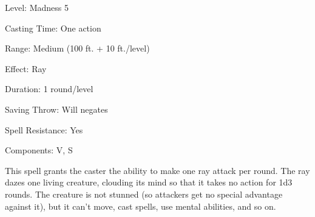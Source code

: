 
\begin{description*}
\item[Level:] Madness 5
\item[Casting Time:] One action
\item[Range:] Medium (100 ft. + 10 ft./level)
\item[Effect:] Ray
\item[Duration:] 1 round/level
\item[Saving Throw:] Will negates
\item[Spell Resistance:] Yes
\item[Components:] V, S
\end{description*}

This spell grants the caster the ability to make one ray attack per round. The
ray dazes one living creature, clouding its mind so that it takes no action for
1d3 rounds. The creature is not stunned (so attackers get no special advantage
against it), but it can't move, cast spells, use mental abilities, and so on.